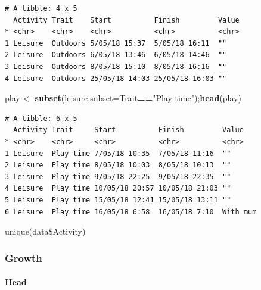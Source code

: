 \documentclass[10,portrait]{article}
\newenvironment{Shaded}{\begin{snugshade}}{\end{snugshade}}
\newcommand{\KeywordTok}[1]{\textcolor[rgb]{0.13,0.29,0.53}{\textbf{#1}}}
\newcommand{\DataTypeTok}[1]{\textcolor[rgb]{0.13,0.29,0.53}{#1}}
\newcommand{\DecValTok}[1]{\textcolor[rgb]{0.00,0.00,0.81}{#1}}
\newcommand{\StringTok}[1]{\textcolor[rgb]{0.31,0.60,0.02}{#1}}
\newcommand{\CommentTok}[1]{\textcolor[rgb]{0.56,0.35,0.01}{\textit{#1}}}
\newcommand{\OperatorTok}[1]{\textcolor[rgb]{0.81,0.36,0.00}{\textbf{#1}}}
\newcommand{\NormalTok}[1]{#1}
\let\oldparagraph\paragraph
\renewcommand{\paragraph}[1]{\oldparagraph{#1}\mbox{}}
\begin{document}
\begin{verbatim}
# A tibble: 4 x 5
  Activity Trait    Start          Finish         Value
* <chr>    <chr>    <chr>          <chr>          <chr>
1 Leisure  Outdoors 5/05/18 15:37  5/05/18 16:11  ""   
2 Leisure  Outdoors 6/05/18 13:46  6/05/18 14:46  ""   
3 Leisure  Outdoors 8/05/18 15:10  8/05/18 16:16  ""   
4 Leisure  Outdoors 25/05/18 14:03 25/05/18 16:03 ""   
\end{verbatim}

\begin{Shaded}
\begin{Highlighting}[]
\NormalTok{play <-}\StringTok{ }\KeywordTok{subset}\NormalTok{(leisure,}\DataTypeTok{subset=}\NormalTok{Trait}\OperatorTok{==}\StringTok{"Play time"}\NormalTok{);}\KeywordTok{head}\NormalTok{(play)}
\end{Highlighting}
\end{Shaded}

\begin{verbatim}
# A tibble: 6 x 5
  Activity Trait     Start          Finish         Value   
* <chr>    <chr>     <chr>          <chr>          <chr>   
1 Leisure  Play time 7/05/18 10:35  7/05/18 11:16  ""      
2 Leisure  Play time 8/05/18 10:03  8/05/18 10:13  ""      
3 Leisure  Play time 9/05/18 22:25  9/05/18 22:35  ""      
4 Leisure  Play time 10/05/18 20:57 10/05/18 21:03 ""      
5 Leisure  Play time 15/05/18 12:41 15/05/18 13:11 ""      
6 Leisure  Play time 16/05/18 6:58  16/05/18 7:10  With mum
\end{verbatim}

unique(data\$Activity)

\subsubsection{Growth}\label{growth}

\paragraph{Head}\label{head}

\begin{Shaded}
\end{Shaded}
\end{document}

